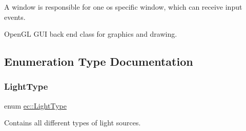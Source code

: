 A window is responsible for one os specific window, which can receive input events.

Open\+GL G\+UI back end class for graphics and drawing. 

\subsection{Enumeration Type Documentation}
\mbox{\label{namespaceec_a30e2a743ebdeb02ac68a6cfa50f629c7}} 
\subsubsection{\texorpdfstring{Light\+Type}{LightType}}
{\footnotesize\ttfamily enum \mbox{\hyperlink{namespaceec_a30e2a743ebdeb02ac68a6cfa50f629c7}{ec\+::\+Light\+Type}}\hspace{0.3cm}{\ttfamily [strong]}}



Contains all different types of light sources. 

